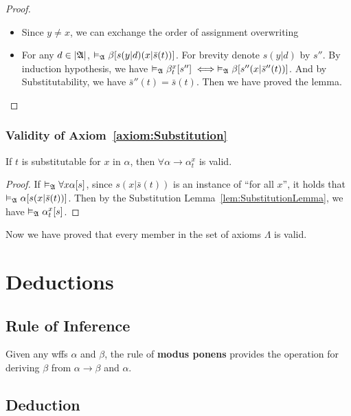 \begin{proof}
\begin{itemize}
\begin{enumerate}
\begin{itemize}
                \item[] Since $y \neq x$, we can exchange the order of assignment overwriting
                \item[] For any $d \in |\mathfrak{A}|$, $\vDash_{\mathfrak{A}}\beta[s(y|d)(x|\bar{s}(t))]$. For brevity denote $s(y|d)$ by $s''$. By induction hypothesis, we have $\vDash_{\mathfrak{A}}\beta_t^x[s''] \iff \vDash_{\mathfrak{A}}\beta[s''(x|\bar{s}''(t))]$. And by Substitutability, we have $\bar{s}''(t) = \bar{s}(t)$. Then we have proved the lemma.
            \end{itemize}
        \end{enumerate} 
    \end{itemize}
\end{proof}

\subsubsection{Validity of Axiom~\ref{axiom:Substitution}}

\begin{theorem}
    If $t$ is substitutable for $x$ in $\alpha$, then $\forall \alpha \to \alpha_t^x$ is valid.
\end{theorem}
\begin{proof}
    If $\vDash_{\mathfrak{A}}\forall x \alpha[s]$, since $s(x|\bar{s}(t))$ is an instance of ``for all $x$'', it holds that $\vDash_{\mathfrak{A}}\alpha[s(x|\bar{s}(t))]$. Then by the Substitution Lemma~\ref{lem:SubstitutionLemma}, we have $\vDash_{\mathfrak{A}}\alpha_t^x[s]$.
\end{proof}

Now we have proved that every member in the set of axioms $\Lambda$ is valid.

\section{Deductions}

\subsection{Rule of Inference}

\begin{definition}
    Given any wffs $\alpha$ and $\beta$, the rule of \textbf{modus ponens} provides the operation for deriving $\beta$ from $\alpha\to\beta$ and $\alpha$.
\end{definition}

\subsection{Deduction}

